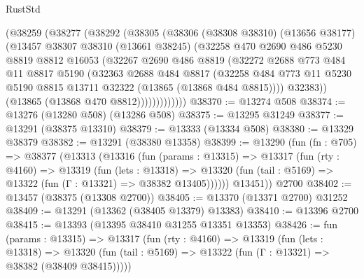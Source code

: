 \begin{lexlean}{RustStd}
\begin{coremodule}
            (@38259
              (@38277
                (@38292
                  (@38305
                    (@38306
                      (@38308 @38310)
                      (@13656 @38177)
                      (@13457
                        @38307
                        @38310
                        (@13661 @38245)
                        (@32258
                          @470
                          @2690
                          @486
                          @5230
                          @8819
                          @8812
                          @16053
                          (@32267
                            @2690
                            @486
                            @8819
                            (@32272
                              @2688
                              @773
                              @484
                              @11
                              @8817
                              @5190
                              (@32363
                                @2688
                                @484
                                @8817
                                (@32258
                                  @484
                                  @773
                                  @11
                                  @5230
                                  @5190
                                  @8815
                                  @13711
                                  @32322
                                  (@13865 (@13868 @484 @8815))))
                              @32383))
                          (@13865 (@13868 @470 @8812)))))))))))))
@38370 := @13274 @508
@38374 := @13276 (@13280 @508) (@13286 @508)
@38375 := @13295 @31249
@38377 := @13291 (@38375 @13310)
@38379 := @13333 (@13334 @508)
@38380 := @13329 @38379
@38382 := @13291 (@38380 @13358)
@38399 := @13290
    (fun (fn : @705) =>
    @38377
      (@13313
        (@13316
          (fun (params : @13315) =>
          @13317
            (fun (rty : @4160) =>
            @13319
              (fun (lets : @13318) =>
              @13320 (fun (tail : @5169) => @13322 (fun (Γ : @13321) => @38382 @13405))))))
        @13451))
    @2700
@38402 := @13457 (@38375 (@13308 @2700))
@38405 := @13370 (@13371 @2700) @31252
@38409 := @13291 (@13362 (@38405 @13379) @13383)
@38410 := @13396 @2700
@38415 := @13393 (@13395 @38410 @31255 @13351 @13353)
@38426 := fun (params : @13315) =>
  @13317
    (fun (rty : @4160) =>
    @13319
      (fun (lets : @13318) =>
      @13320 (fun (tail : @5169) => @13322 (fun (Γ : @13321) => @38382 (@38409 @38415)))))

\end{coremodule}
\end{lexlean}
